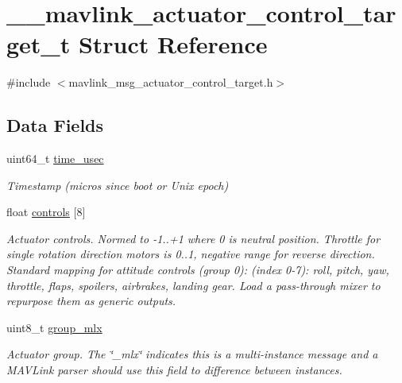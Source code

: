\hypertarget{struct____mavlink__actuator__control__target__t}{\section{\+\_\+\+\_\+mavlink\+\_\+actuator\+\_\+control\+\_\+target\+\_\+t Struct Reference}
\label{struct____mavlink__actuator__control__target__t}
}


{\ttfamily \#include $<$mavlink\+\_\+msg\+\_\+actuator\+\_\+control\+\_\+target.\+h$>$}

\subsection*{Data Fields}
\begin{DoxyCompactItemize}
\item 
uint64\+\_\+t \hyperlink{struct____mavlink__actuator__control__target__t_a6515683b07d3141ba6b997f2ad6c6b32}{time\+\_\+usec}
\begin{DoxyCompactList}\small\item\em Timestamp (micros since boot or Unix epoch) \end{DoxyCompactList}\item 
float \hyperlink{struct____mavlink__actuator__control__target__t_a2fab71cddada32b7f1d23d5afec2b8b3}{controls} \mbox{[}8\mbox{]}
\begin{DoxyCompactList}\small\item\em Actuator controls. Normed to -\/1..+1 where 0 is neutral position. Throttle for single rotation direction motors is 0..1, negative range for reverse direction. Standard mapping for attitude controls (group 0)\+: (index 0-\/7)\+: roll, pitch, yaw, throttle, flaps, spoilers, airbrakes, landing gear. Load a pass-\/through mixer to repurpose them as generic outputs. \end{DoxyCompactList}\item 
uint8\+\_\+t \hyperlink{struct____mavlink__actuator__control__target__t_a2f43180f864758575cea6d59d23ab6c8}{group\+\_\+mlx}
\begin{DoxyCompactList}\small\item\em Actuator group. The \char`\"{}\+\_\+mlx\char`\"{} indicates this is a multi-\/instance message and a M\+A\+V\+Link parser should use this field to difference between instances. \end{DoxyCompactList}\end{DoxyCompactItemize}


